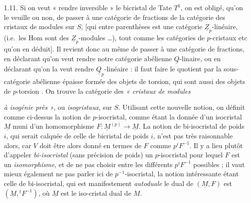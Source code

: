 \documentclass[11pt,a4paper]{article}
\begin{document}
1.11. Si on veut « rendre inversible » le bicristal de Tate $T^1$, on est
obligé, qu'on le veuille ou non, de passer à une catégorie de fractions de la
catégorie des cristaux de modules sur $S$, [qui entre parenthèses est une
catégorie $\underline{Z}_p$-linéaire, (i.e.\ les Hom sont des
$\underline{Z}_p$-modules \ldots), tout comme les catégories de $p$-cristaux
etc qu'on en déduit]. Il revient donc au même de passer à une catégorie de
fractions, en déclarant qu'on veut rendre notre catégorie abélienne
$\underline{Q}$-linaire, ou en déclarant qu'on la veut rendre
$\underline{Q}_p$-linéaire : il faut faire le quotient par la sous-catégorie
abélienne épaisse formée des objets de torsion, qui sont aussi des objets de
$p$-torsion . On trouve la catégorie des \emph{« cristaux
de modules}

\emph{à isogénie près »}, ou \emph{isogristaux}, sur $S$. Utilisant cette
nouvelle notion, on définit comme ci-dessus la notion de $p$-isocristal, comme
étant la donnée d'un isocristal $\underline{M}$ muni d'un homomorphisme
$F\colon\underline{M}^{(p)}\to\underline{M}$. La notion de bi-isocristal de
poids $i$, qui serait calquée de celle de bicristal de poids $i$, n'est pas
très raisonnable alors, car $V$ doit être alors donné en termes de $F$ comme
$p^iF^{-1}$. Il y a lieu plutôt d'appeler \emph{bi-isocristal} (sans
précision de poids) un $p$-isocristal pour lequel $F$ est un
\emph{isomorphisme}, et de ne pas choisir entre les différents $p^iF^{-1}$
possibles ; il vaut mieux également ne pas parler ici de
$p^{-1}$-isocristal, la notion intéressante étant celle de bi-isocristal, qui
est manifestement \emph{autoduale}   le dual de $(\underline{M},F)$ est
$(\underline{M},{}^tF^{-1})$, où $\underline{M}$ est le iso-cristal dual de
$M$.
\end{document}
